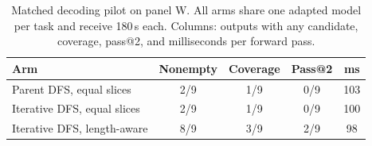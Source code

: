 \begin{table}[t]\centering\small
\caption{Matched decoding pilot on panel W. All arms share one adapted model per task and receive 180\,s each. Columns: outputs with any candidate, coverage, pass@2, and milliseconds per forward pass.}\label{tab:pilot}
\setlength{\tabcolsep}{3pt}\begin{tabular}{lcccc}\toprule
Arm & Nonempty & Coverage & Pass@2 & ms \\\midrule
Parent DFS, equal slices & 2/9 & 1/9 & 0/9 & 103 \\
Iterative DFS, equal slices & 2/9 & 1/9 & 0/9 & 100 \\
Iterative DFS, length-aware & 8/9 & 3/9 & 2/9 & 98 \\
\bottomrule\end{tabular}\end{table}
